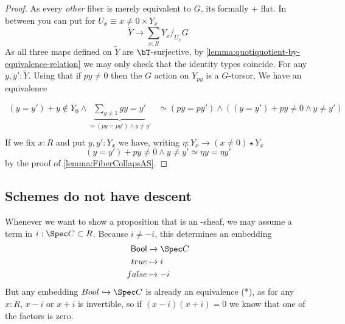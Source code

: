 \begin{proof}
	As every \emph{other} fiber is merely equivalent to $G$, its formally \etale + flat.
	In between you can put for $U_x \equiv x \neq 0 \times Y_x$
	\[\tilde Y \to \sum_{x : R} Y_x /_{U_x} G\]
	As all three maps defined on $\tilde Y$ are $\bT$-surjective, by \ref{lemma:quotiquotient-by-equivalence-relation} we may only check that the identity types coincide. For any $y,y' : \tilde Y$. Using that if $py \neq 0$ then the $G$ action on $Y_{py}$ is a $G$-torsor, We have an equivalence
	
	\begin{align*}
		(y = y') + y \not \in Y_0 \land \underbrace{\sum_{g \neq 1} g y = y' }_{\simeq (py = py') \land y \neq y'} &\simeq  (py = py') \land ((y = y') + py \neq 0 \land y \neq y' ) \\
	\end{align*}
	If we fix $x : R$ and put $y,y' : Y_x$ we have, writing $\eta : Y_x \to (x \neq 0) \star Y_x$
	\[
	(y = y') + py \neq 0 \land y \neq y'  \simeq \eta y = \eta y'
	\]
	by the proof of \ref{lemma:FiberCollapsAS}.
\end{proof}
\subsection{Schemes do not have descent}
\begin{rmk}
	Whenever we want to show a proposition that is an \etale-sheaf, we may assume a term in $i : \Spec C \subset R$. Because $i \neq -i$, this determines an embedding 
	\begin{align*}
		\mathsf{Bool} &\to \Spec C \\
		true &\mapsto i \\
		false &\mapsto -i
	\end{align*}
	But any embedding $Bool \hookrightarrow \Spec C$ is already an equivalence (*), as for any $x : R$, $x-i$ or $x+i$ is invertible, so if $(x-i)(x+i) = 0$ we know that one of the factors is zero.
\end{rmk}

